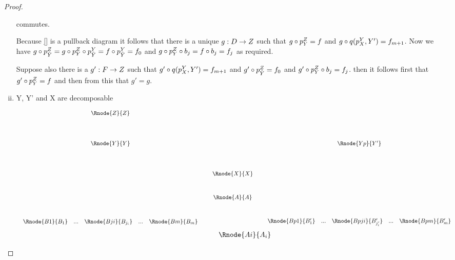 \documentclass[10pt,a4paper]{scrartcl}
\begin{document}
\begin{proof}
\begin{enumerate}[(i)]
commutes.

Because \ref{} is a pullback diagram  it follows that there is a unique $g:D \rightarrow Z$
such that $g \circ p^{Z}_{Y}=f$ and $g \circ q(p^{Y}_{X},Y')=f_{m+1}$.
\noindent
Now we have $g \circ p^{Z}_{\tilde{Y}}=g \circ p^{Z}_{Y} \circ p^{Y}_{\tilde{Y}}= f \circ p^{Y}_{\tilde{Y}}=f_0$
and $g \circ p^{Z}_{Y} \circ b_j = f \circ b_j = f_j$ as required.

\noindent
Suppose also there is a $g' :F \rightarrow Z$ such that
$g' \circ q(p^{Y}_{X},Y')=f_{m+1}$
and
$g' \circ p^{Z}_{\tilde{Y}}=f_0$
and 
$g' \circ p^{Z}_{Y} \circ b_j=f_j$.
then it follows first that $g' \circ p^{Z}_{Y}=f$ and then from this that $g'=g$. 


\newpage

\item{Y, Y' and X are decomposable}
\begin{center}
\begin{displaymath}
\begin{array}{c c c c c}
  \Rnode{Z}{Z} & &              & &                   \\ [1.4cm]
  \Rnode{Y}{Y} & &              & &  \Rnode{Yp}{Y'}    \\ [1.4cm]
	             & & \Rnode{X}{X} & &                    \\ [1.0cm]
               & & \Rnode{A}{A} & &                    \\ [1.0cm]
	 \begin{array}{cp{0.3cm}c         p{0.3cm}  c}					
   \Rnode{B1}{B_1}&  ... & \Rnode{Bji}{B_{j_i}} & ... & \Rnode{Bm}{B_m}
	 \end{array} 
	 & & & &
	\begin{array}{c c c c c}					
   \Rnode{Bp1}{B'_1}& ... & \Rnode{Bpji}{B'_{j'_i}}&  ... & \Rnode{Bpm}{B'_m}
	 \end{array}                                                
\end{array} 
\end{displaymath}
\vspace{1.0cm}
\begin{displaymath}
\begin{array}{c c c c c}
 & &               &  & \Rnode{Ai}{A_i}    \\
\end{array}
\end{displaymath}
\end{center}

\end{enumerate}
\end{proof}
\newpage
\end{document}
